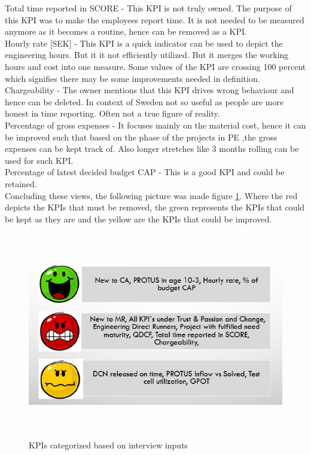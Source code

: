 \begin{itemize}
Total time reported in SCORE - This KPI is not truly owned. The purpose of this KPI was to make the employees report time. 
It is not needed to be measured anymore as it becomes a routine, hence can be removed as a KPI.\\

Hourly rate [SEK] - This KPI is a quick indicator can be used to depict the engineering hours. But it it not efficiently utilized. But it merges the working hours and cost into one measure. Some values of the KPI are crossing 100 percent which signifies there may be some improvements needed in definition.\\

Chargeability - The owner mentions that this KPI drives  wrong behaviour and hence can be deleted. In context of Sweden not so useful as people are more honest in time reporting. Often not a true figure of reality.\\

Percentage of gross expenses - It focuses mainly on the material cost, hence it can be improved such that based on the phase of the projects in PE ,the gross expenses can be kept track of.
Also longer stretches like 3 months rolling can be used for such KPI.\\

Percentage of latest decided budget CAP - This is a good KPI and could be retained.\\

Concluding these views, the following picture was made figure \ref{fig:5.3}. Where the red depicts the KPIs that must be removed, the green represents the KPIs that could be kept as they are and the yellow are the KPIs that could be improved.\\
\end{itemize}
    \begin{figure}[H]
    \centering
    \captionsetup{justification=centering, margin=2cm}
    \vspace{1cm}
    \includegraphics[width=15cm, height=9cm]{figure/auxiliary/fig53.PNG}
    \caption{ KPIs categorized based on interview inputs}
    \label{fig:5.3}
\end{figure}

